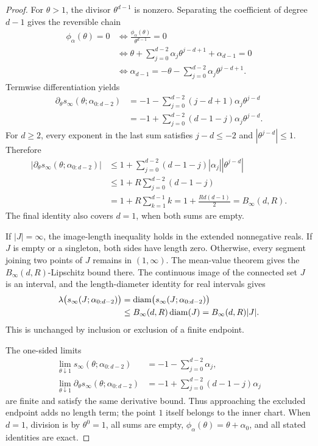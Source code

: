 \begin{proof}
For $\theta>1$, the divisor $\theta^{d-1}$ is nonzero.  Separating the
coefficient of degree $d-1$ gives the reversible chain
\[
\begin{aligned}
\phi_\alpha(\theta)=0
&\Longleftrightarrow \frac{\phi_\alpha(\theta)}{\theta^{d-1}}=0\\
&\Longleftrightarrow
\theta+\sum_{j=0}^{d-2}\alpha_j\theta^{j-d+1}
+\alpha_{d-1}=0\\
&\Longleftrightarrow
\alpha_{d-1}=-\theta-\sum_{j=0}^{d-2}\alpha_j\theta^{j-d+1}.
\end{aligned}
\]
Termwise differentiation yields
\[
\begin{aligned}
\partial_\theta s_\infty(\theta;\alpha_{0:d-2})
&=-1-\sum_{j=0}^{d-2}(j-d+1)\alpha_j\theta^{j-d}\\
&=-1+\sum_{j=0}^{d-2}(d-1-j)\alpha_j\theta^{j-d}.
\end{aligned}
\]
For $d\geq2$, every exponent in the last sum satisfies $j-d\leq-2$ and
$|\theta^{j-d}|\leq1$.  Therefore
\[
\begin{aligned}
|\partial_\theta s_\infty(\theta;\alpha_{0:d-2})|
&\leq1+\sum_{j=0}^{d-2}(d-1-j)|\alpha_j||\theta^{j-d}|\\
&\leq1+R\sum_{j=0}^{d-2}(d-1-j)\\
&=1+R\sum_{k=1}^{d-1}k
=1+\frac{Rd(d-1)}2=B_\infty(d,R).
\end{aligned}
\]
The final identity also covers $d=1$, when both sums are empty.

If $|J|=\infty$, the image-length inequality holds in the extended
nonnegative reals.  If $J$ is empty or a singleton, both sides have length
zero.  Otherwise, every segment joining two points of $J$ remains in
$(1,\infty)$.  The mean-value theorem gives the
$B_\infty(d,R)$-Lipschitz bound there.  The continuous image of the connected
set $J$ is an interval, and the length-diameter identity for real intervals
gives
\[
\begin{aligned}
\lambda\bigl(s_\infty(J;\alpha_{0:d-2})\bigr)
&=\operatorname{diam}\bigl(s_\infty(J;\alpha_{0:d-2})\bigr)\\
&\leq B_\infty(d,R)\operatorname{diam}(J)
=B_\infty(d,R)|J|.
\end{aligned}
\]
This is unchanged by inclusion or exclusion of a finite endpoint.

The one-sided limits
\[
\begin{aligned}
\lim_{\theta\downarrow1}s_\infty(\theta;\alpha_{0:d-2})
&=-1-\sum_{j=0}^{d-2}\alpha_j,\\
\lim_{\theta\downarrow1}\partial_\theta s_\infty(\theta;\alpha_{0:d-2})
&=-1+\sum_{j=0}^{d-2}(d-1-j)\alpha_j
\end{aligned}
\]
are finite and satisfy the same derivative bound.  Thus approaching the
excluded endpoint adds no length term; the point $1$ itself belongs to the
inner chart.  When $d=1$, division is by $\theta^0=1$, all sums are empty,
$\phi_\alpha(\theta)=\theta+\alpha_0$, and all stated identities are exact.
\end{proof}


